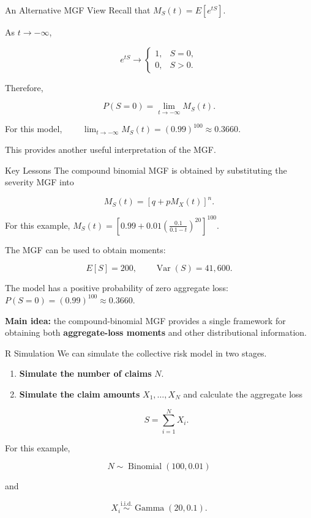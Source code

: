 \documentclass[
  ignorenonframetext,
  aspectratio=169,
]{beamer}
\begin{document}
\begin{frame}{An Alternative MGF View}
\protect{}\label{an-alternative-mgf-view}
Recall that \(M_S(t)=E[e^{tS}].\)

As \(t\to-\infty\),

\[
e^{tS}\to
\begin{cases}
1, & S=0,\\
0, & S>0.
\end{cases}
\]

Therefore,

\[
P(S=0)
=
\lim_{t\to-\infty}M_S(t).
\]

For this model,
\(\qquad \lim_{t\to-\infty}M_S(t)=(0.99)^{100} \approx0.3660.\)

This provides another useful interpretation of the MGF.
\end{frame}

\begin{frame}{Key Lessons}
\protect{}\label{key-lessons}
The compound binomial MGF is obtained by substituting the severity MGF
into

\[
M_S(t)=\left[q+pM_X(t)\right]^n.
\]

For this example,
\(\boxed{M_S(t)=\left[0.99+0.01\left(\frac{0.1}{0.1-t}\right)^{20}\right]^{100}}.\)

The MGF can be used to obtain moments:

\[
E[S]=200,
\qquad
\operatorname{Var}(S)=41{,}600.
\]

The model has a positive probability of zero aggregate loss:
\(P(S=0)=(0.99)^{100}\approx0.3660.\)

\textbf{Main idea:} the compound-binomial MGF provides a single
framework for obtaining both \textbf{aggregate-loss moments} and other
distributional information.
\end{frame}

\begin{frame}{R Simulation}
\protect{}\label{r-simulation}
We can simulate the collective risk model in two stages.

\begin{enumerate}
\item
  \textbf{Simulate the number of claims} \(N\).
\item
  \textbf{Simulate the claim amounts} \(X_1,\ldots,X_N\) and calculate
  the aggregate loss

  \[
  S=\sum_{i=1}^{N}X_i.
  \]
\end{enumerate}

For this example,

\[
N\sim\operatorname{Binomial}(100,0.01)
\]

and

\[
X_i\overset{\text{i.i.d.}}{\sim}\operatorname{Gamma}(20,0.1).
\]
\end{frame}
\end{document}
